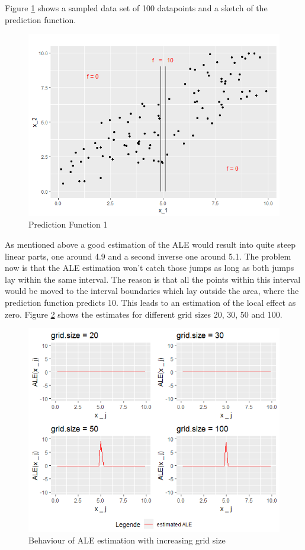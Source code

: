 \documentclass[
]{krantz}
\begin{document}
Figure \ref{fig:pwcexample4datasetpredf} shows a sampled data set of 100 datapoints and a sketch of the prediction function.

\begin{figure}
\includegraphics[width=1\linewidth]{images/ALE_2_pwc_example4_dataset_predf_} \caption{Prediction Function 1}\label{fig:pwcexample4datasetpredf}
\end{figure}



As mentioned above a good estimation of the ALE would result into quite steep linear parts, one around 4.9 and a second inverse one around 5.1. The problem now is that the ALE estimation won't catch those jumps as long as both jumps lay within the same interval. The reason is that all the points within this interval would be moved to the interval boundaries which lay outside the area, where the prediction function predicts 10. This leads to an estimation of the local effect as zero.
Figure \ref{fig:pwcexample44plots} shows the estimates for different grid sizes 20, 30, 50 and 100.

\begin{figure}
\includegraphics[width=1\linewidth]{images/ALE_2_pwc_example4_4plots_} \caption{Behaviour of ALE estimation with increasing grid size}\label{fig:pwcexample44plots}
\end{figure}
\end{document}
